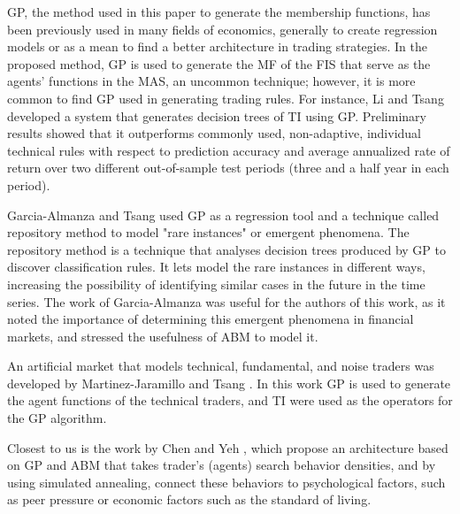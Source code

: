 \documentclass[a4paper,twoside]{article}
\begin{document}

GP, the method used in this paper to generate the membership
functions, has been previously used in many fields of
economics, generally to create regression models or as a
mean to find a better architecture in trading strategies. In the
proposed method, GP is used to generate the MF of the FIS that serve
as the agents' functions in the MAS, an uncommon technique; however,
it is more common to find GP used in generating trading rules. For
instance, Li and Tsang \cite{Li1999} developed a system that generates
decision trees of TI using GP. Preliminary results showed that it
outperforms commonly used, non-adaptive, individual technical rules
with respect to prediction accuracy and average annualized rate of
return over two different out-of-sample test periods (three and a half
year in each period). 

Garcia-Almanza and Tsang \cite{Garcia-Almanza2006} used GP as a
regression tool and a technique called repository method to model
"rare instances" or emergent phenomena. The repository method is a
technique that analyses decision trees produced by GP to discover
classification rules. It lets model the rare instances in different
ways, increasing the possibility of identifying similar cases in the
future in the time series. The work of Garcia-Almanza was useful for
the authors of this work, as it noted the importance of determining
this emergent phenomena in financial markets, and stressed the
usefulness of ABM to model it. 

An artificial market that models technical, fundamental, and noise
traders was developed by Martinez-Jaramillo and Tsang
\cite{Martinez-Jaramillo2009}. In this work GP is used to generate the
agent functions \cite{russell2003artificial} of the technical traders,
and TI were used as the operators for the GP algorithm. 

Closest to us is the work by Chen and Yeh \cite{Chen2001}, which
propose an architecture based on GP and ABM that takes trader's
(agents) search behavior densities, and by using simulated annealing,
connect these behaviors to psychological factors, such as peer
pressure or economic factors such as the standard of living. 

\end{document}
